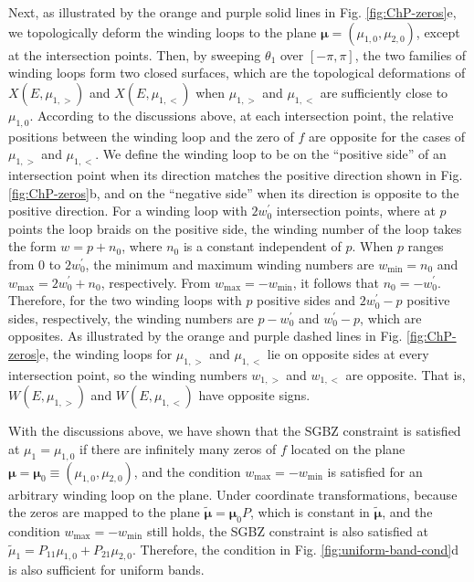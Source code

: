 Next, as illustrated by the orange and purple solid lines in Fig.
\ref{fig:ChP-zeros}e, we topologically deform the winding loops to
the plane $\boldsymbol{\mu}=(\mu_{1,0},\mu_{2,0})$, except at the
intersection points. Then, by sweeping $\theta_{1}$ over $[-\pi,\pi]$,
the two families of winding loops form two closed surfaces, which
are the topological deformations of $X(E,\mu_{1,>})$ and $X(E,\mu_{1,<})$
when $\mu_{1,>}$ and $\mu_{1,<}$ are sufficiently close to $\mu_{1,0}$.
According to the discussions above, at each intersection point, the
relative positions between the winding loop and the zero of $f$ are
opposite for the cases of $\mu_{1,>}$ and $\mu_{1,<}$. We define
the winding loop to be on the ``positive side'' of an intersection
point when its direction matches the positive direction shown in Fig.
\ref{fig:ChP-zeros}b, and on the ``negative side'' when its direction
is opposite to the positive direction. For a winding loop with $2w_{0}^{\prime}$
intersection points, where at $p$ points the loop braids on the positive
side, the winding number of the loop takes the form $w=p+n_{0}$,
where $n_{0}$ is a constant independent of $p$. When $p$ ranges
from $0$ to $2w_{0}^{\prime}$, the minimum and maximum winding numbers
are $w_{\text{min}}=n_{0}$ and $w_{\text{max}}=2w_{0}^{\prime}+n_{0}$,
respectively. From $w_{\text{max}}=-w_{\text{min}}$, it follows that
$n_{0}=-w_{0}^{\prime}$. Therefore, for the two winding loops with
$p$ positive sides and $2w_{0}^{\prime}-p$ positive sides, respectively,
the winding numbers are $p-w_{0}^{\prime}$ and $w_{0}^{\prime}-p$,
which are opposites. As illustrated by the orange and purple dashed
lines in Fig. \ref{fig:ChP-zeros}e, the winding loops for $\mu_{1,>}$
and $\mu_{1,<}$ lie on opposite sides at every intersection point,
so the winding numbers $w_{1,>}$ and $w_{1,<}$ are opposite. That
is, $W(E,\mu_{1,>})$ and $W(E,\mu_{1,<})$
have opposite signs.

With the discussions above, we have shown that the SGBZ constraint
is satisfied at $\mu_{1}=\mu_{1,0}$ if there are infinitely many
zeros of $f$ located on the plane $\boldsymbol{\mu}=\boldsymbol{\mu}_{0}\equiv(\mu_{1,0},\mu_{2,0})$,
and the condition $w_{\text{max}}=-w_{\text{min}}$ is satisfied for
an arbitrary winding loop on the plane. Under coordinate transformations,
because the zeros are mapped to the plane $\tilde{\boldsymbol{\mu}}=\boldsymbol{\mu}_{0}P$,
which is constant in $\tilde{\boldsymbol{\mu}}$, and the condition
$w_{\text{max}}=-w_{\text{min}}$ still holds, the SGBZ constraint
is also satisfied at $\tilde{\mu}_{1}=P_{11}\mu_{1,0}+P_{21}\mu_{2,0}$.
Therefore, the condition in Fig. \ref{fig:uniform-band-cond}d is
also sufficient for uniform bands.

